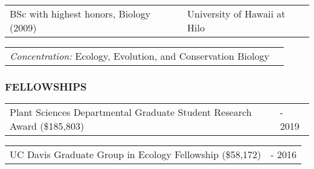 \documentclass[11pt,english]{article}
\providecommand{\tabularnewline}{\\}
\begin{document}
\vspace{0.5ex}

\begin{tabular}{>{\raggedright}p{4in}>{\raggedleft}p{2in}}
BSc with highest honors, Biology (2009) & University of Hawaii at Hilo\tabularnewline
\end{tabular}

\hspace{1.0em}
\begin{tabular}{p{6in}p{0in}}
\emph{Concentration:} Ecology, Evolution, and Conservation Biology &
\end{tabular}


\vspace{1.5ex}
\subsubsection*{FELLOWSHIPS}
\vspace{-0.5ex}

%
%
%
%


\begin{tabular}{>{\raggedright}p{5.2in}>{\raggedleft}p{0.8in}}
Plant Sciences Departmental Graduate Student Research Award (\$185,803) & 2015 - 2019
\end{tabular}

\begin{tabular}{>{\raggedright}p{5in}>{\raggedleft}p{1in}}
UC Davis Graduate Group in Ecology Fellowship (\$58,172) & 2014 - 2016
\end{tabular}
\end{document}
